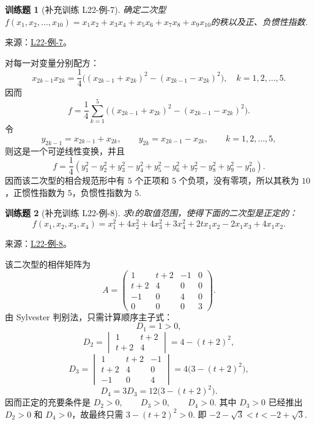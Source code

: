 \documentclass[UTF8,12pt,a4paper,fontset=fandol]{ctexart}
\newtheorem{exercise}{训练题}[section]
\begin{document}
\begin{exercise}[补充训练 L22-例-7]\label{prob:L22-例-7}
确定二次型$f(x_1,x_2,\ldots,x_{10})=x_1x_2+x_3x_4+x_5x_6+x_7x_8+x_9x_{10}$的秩以及正、负惯性指数.
\end{exercise}
\noindent 来源：\href{https://github.com/yhwu-is/Linear-Algebra-Left-Undone/blob/new/%E8%AE%B2%E4%B9%89/%E4%B8%93%E9%A2%98/22%20%E4%BA%8C%E6%AC%A1%E5%9E%8B.tex}{L22-例-7}。
\begin{solve}
对每一对变量分别配方：
    \[
        x_{2k-1}x_{2k}=\frac{1}{4}\bigl((x_{2k-1}+x_{2k})^2-(x_{2k-1}-x_{2k})^2\bigr), \quad k=1,2,\ldots,5.
    \]
    因而
    \[
        f=\frac{1}{4}\sum_{k=1}^5\bigl((x_{2k-1}+x_{2k})^2-(x_{2k-1}-x_{2k})^2\bigr).
    \]
    令
    \[
        y_{2k-1}=x_{2k-1}+x_{2k}, \qquad y_{2k}=x_{2k-1}-x_{2k}, \qquad k=1,2,\ldots,5,
    \]
    则这是一个可逆线性变换，并且
    \[
        f=\frac{1}{4}(y_1^2-y_2^2+y_3^2-y_4^2+y_5^2-y_6^2+y_7^2-y_8^2+y_9^2-y_{10}^2).
    \]
    因而该二次型的相合规范形中有 $5$ 个正项和 $5$ 个负项，没有零项，所以其秩为 $10$，正惯性指数为 $5$，负惯性指数为 $5$.
\end{solve}

\begin{exercise}[补充训练 L22-例-8]\label{prob:L22-例-8}
求$t$的取值范围，使得下面的二次型是正定的：
    \[f(x_1,x_2,x_3,x_4) = x_1^2+4x_2^2+4x_3^2+3x_4^2+2tx_1x_2-2x_1x_3+4x_1x_2.\]
\end{exercise}
\noindent 来源：\href{https://github.com/yhwu-is/Linear-Algebra-Left-Undone/blob/new/%E8%AE%B2%E4%B9%89/%E4%B8%93%E9%A2%98/22%20%E4%BA%8C%E6%AC%A1%E5%9E%8B.tex}{L22-例-8}。
\begin{solve}
该二次型的相伴矩阵为
    \[
        A=\begin{pmatrix}
            1 & t+2 & -1 & 0 \\
            t+2 & 4 & 0 & 0 \\
            -1 & 0 & 4 & 0 \\
            0 & 0 & 0 & 3
        \end{pmatrix}.
    \]
    由 Sylvester 判别法，只需计算顺序主子式：
    \[
        D_1=1>0,
    \]
    \[
        D_2=\begin{vmatrix}
            1 & t+2 \\
            t+2 & 4
        \end{vmatrix}
        =4-(t+2)^2,
    \]
    \[
        D_3 = \begin{vmatrix}
                 1 & t+2 & -1 \\
                 t+2 & 4 & 0 \\
                 -1 & 0 & 4
             \end{vmatrix} = 4\bigl(3-(t+2)^2\bigr),
    \]
    \[
        D_4=3D_3=12\bigl(3-(t+2)^2\bigr).
    \]
    因而正定的充要条件是 $D_2>0,\qquad D_3>0,\qquad D_4>0$. 其中 $D_3>0$ 已经推出 $D_2>0$ 和 $D_4>0$，故最终只需 $3-(t+2)^2>0$. 即 $-2-\sqrt{3}<t<-2+\sqrt{3}$.
\end{solve}
\end{document}
